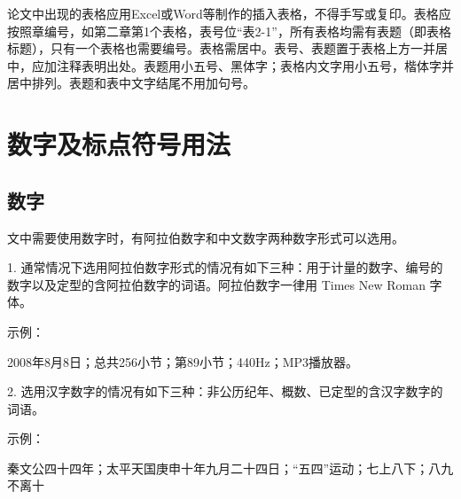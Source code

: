 论文中出现的表格应用Excel或Word等制作的插入表格，不得手写或复印。表格应按照章编号，如第二章第1个表格，表号位“表2-1”，所有表格均需有表题（即表格标题），只有一个表格也需要编号。表格需居中。表号、表题置于表格上方一并居中，应加注释表明出处。表题用小五号、黑体字；表格内文字用小五号，楷体字并居中排列。表题和表中文字结尾不用加句号。


%
%
%
%		
%		

\section{数字及标点符号用法}

\subsection{数字}

文中需要使用数字时，有阿拉伯数字和中文数字两种数字形式可以选用。

1. 通常情况下选用阿拉伯数字形式的情况有如下三种：用于计量的数字、编号的数字以及定型的含阿拉伯数字的词语。阿拉伯数字一律用 Times New Roman 字体。

示例：

2008年8月8日；总共256小节；第89小节；440Hz；MP3播放器。

2. 选用汉字数字的情况有如下三种：非公历纪年、概数、已定型的含汉字数字的词语。

示例：

秦文公四十四年；太平天国庚申十年九月二十四日；“五四”运动；七上八下；八九不离十

